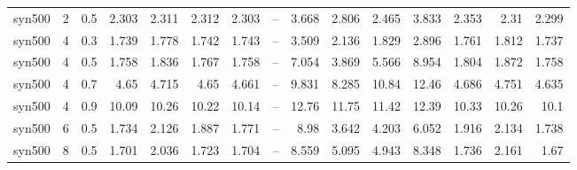 \begin{table}
\begin{tabular}{lrrrrrrrrrrrrrr}
syn500 & 2 & 0.5 & 2.303 & 2.311 & 2.312 & 2.303 & -- & 3.668 & 2.806 & 2.465 & 3.833 & 2.353 & 2.31 & 2.299 \\
syn500 & 4 & 0.3 & 1.739 & 1.778 & 1.742 & 1.743 & -- & 3.509 & 2.136 & 1.829 & 2.896 & 1.761 & 1.812 & 1.737 \\
syn500 & 4 & 0.5 & 1.758 & 1.836 & 1.767 & 1.758 & -- & 7.054 & 3.869 & 5.566 & 8.954 & 1.804 & 1.872 & 1.758 \\
syn500 & 4 & 0.7 & 4.65 & 4.715 & 4.65 & 4.661 & -- & 9.831 & 8.285 & 10.84 & 12.46 & 4.686 & 4.751 & 4.635 \\
syn500 & 4 & 0.9 & 10.09 & 10.26 & 10.22 & 10.14 & -- & 12.76 & 11.75 & 11.42 & 12.39 & 10.33 & 10.26 & 10.1 \\
syn500 & 6 & 0.5 & 1.734 & 2.126 & 1.887 & 1.771 & -- & 8.98 & 3.642 & 4.203 & 6.052 & 1.916 & 2.134 & 1.738 \\
syn500 & 8 & 0.5 & 1.701 & 2.036 & 1.723 & 1.704 & -- & 8.559 & 5.095 & 4.943 & 8.348 & 1.736 & 2.161 & 1.67 \\
\bottomrule
\end{tabular}
\end{table}
